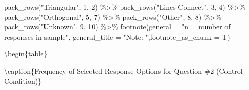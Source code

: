 \documentclass[
  letterpaper,
  DIV=11,
  numbers=noendperiod]{scrreprt}
\newenvironment{Shaded}{\begin{snugshade}}{\end{snugshade}}
\newcommand{\AttributeTok}[1]{\textcolor[rgb]{0.40,0.45,0.13}{#1}}
\newcommand{\DecValTok}[1]{\textcolor[rgb]{0.68,0.00,0.00}{#1}}
\newcommand{\FunctionTok}[1]{\textcolor[rgb]{0.28,0.35,0.67}{#1}}
\newcommand{\NormalTok}[1]{\textcolor[rgb]{0.00,0.23,0.31}{#1}}
\newcommand{\SpecialCharTok}[1]{\textcolor[rgb]{0.37,0.37,0.37}{#1}}
\newcommand{\StringTok}[1]{\textcolor[rgb]{0.13,0.47,0.30}{#1}}
\begin{document}
\begin{Shaded}
\begin{Highlighting}[]
  \FunctionTok{pack\_rows}\NormalTok{(}\StringTok{"Triangular"}\NormalTok{, }\DecValTok{1}\NormalTok{, }\DecValTok{2}\NormalTok{) }\SpecialCharTok{\%\textgreater{}\%}
  \FunctionTok{pack\_rows}\NormalTok{(}\StringTok{"Lines{-}Connect"}\NormalTok{, }\DecValTok{3}\NormalTok{, }\DecValTok{4}\NormalTok{) }\SpecialCharTok{\%\textgreater{}\%} 
  \FunctionTok{pack\_rows}\NormalTok{(}\StringTok{"Orthogonal"}\NormalTok{, }\DecValTok{5}\NormalTok{, }\DecValTok{7}\NormalTok{) }\SpecialCharTok{\%\textgreater{}\%}
  \FunctionTok{pack\_rows}\NormalTok{(}\StringTok{"Other"}\NormalTok{, }\DecValTok{8}\NormalTok{, }\DecValTok{8}\NormalTok{)  }\SpecialCharTok{\%\textgreater{}\%} 
  \FunctionTok{pack\_rows}\NormalTok{(}\StringTok{"Unknown"}\NormalTok{, }\DecValTok{9}\NormalTok{, }\DecValTok{10}\NormalTok{)  }\SpecialCharTok{\%\textgreater{}\%} 
  \FunctionTok{footnote}\NormalTok{(}\AttributeTok{general =} \StringTok{"n = number of responses in sample"}\NormalTok{, }
           \AttributeTok{general\_title =} \StringTok{"Note: "}\NormalTok{,}\AttributeTok{footnote\_as\_chunk =}\NormalTok{ T) }
\end{Highlighting}
\end{Shaded}

\textbackslash begin\{table\}

\textbackslash caption\{\label{tab:Q2-CONTROL-RESPONSES}Frequency of
Selected Response Options for Question \#2 (Control Condition)\}
\centering
\end{document}
